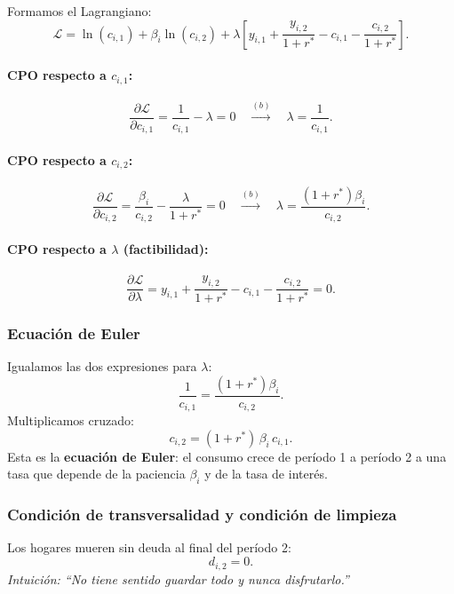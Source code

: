 Formamos el Lagrangiano:
\[
\mathcal{L} = \ln(c_{i,1}) + \beta_i \ln(c_{i,2})
              + \lambda \!\left[y_{i,1} + \frac{y_{i,2}}{1+r^*}
              - c_{i,1} - \frac{c_{i,2}}{1+r^*}\right].
\]

\paragraph{CPO respecto a $c_{i,1}$:}
\[
    \frac{\partial \mathcal{L}}{\partial c_{i,1}} = \frac{1}{c_{i,1}} - \lambda = 0
    \quad\xrightarrow{(b)}\quad
    \lambda = \frac{1}{c_{i,1}}.
    \tag{b}
\]

\paragraph{CPO respecto a $c_{i,2}$:}
\[
    \frac{\partial \mathcal{L}}{\partial c_{i,2}}
    = \frac{\beta_i}{c_{i,2}} - \frac{\lambda}{1+r^*} = 0
    \quad\xrightarrow{(b)}\quad
    \lambda = \frac{(1+r^*)\beta_i}{c_{i,2}}.
    \tag{b}
\]

\paragraph{CPO respecto a $\lambda$ (factibilidad):}
\[
    \frac{\partial \mathcal{L}}{\partial \lambda}
    = y_{i,1} + \frac{y_{i,2}}{1+r^*} - c_{i,1} - \frac{c_{i,2}}{1+r^*} = 0.
    \tag{iv}
\]

\subsubsection*{Ecuación de Euler}

Igualamos las dos expresiones para $\lambda$:
\[
    \frac{1}{c_{i,1}} = \frac{(1+r^*)\beta_i}{c_{i,2}}.
\]
Multiplicamos cruzado:
\[
    c_{i,2} = (1+r^*)\,\beta_i\, c_{i,1}.
    \tag{5}\label{eq:euler}
\]
Esta es la \textbf{ecuación de Euler}: el consumo crece de período 1 a período 2
a una tasa que depende de la paciencia $\beta_i$ y de la tasa de interés.

\subsubsection*{Condición de transversalidad y condición de limpieza}

\begin{condicion}[Transversalidad]
Los hogares mueren sin deuda al final del período 2:
\[
    d_{i,2} = 0.
\]
\textit{Intuición: ``No tiene sentido guardar todo y nunca disfrutarlo.''}
\end{condicion}

